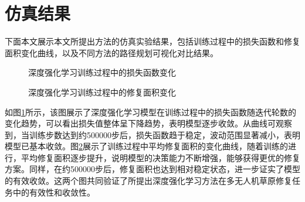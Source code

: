 \documentclass[AutoFakeBold]{LZUThesis}
\begin{document}
\section{仿真结果}


下面本文展示本文所提出方法的仿真实验结果，包括训练过程中的损失函数和修复面积变化曲线，以及不同方法的路径规划可视化对比结果。

\begin{figure}[H]
	\centering
	
	\caption{深度强化学习训练过程中的损失函数变化}
	\label{fig:training_loss_curve}
\end{figure}

\begin{figure}[H]
	\centering
	
	\caption{深度强化学习训练过程中的修复面积变化}
	\label{fig:training_reward_curve}
\end{figure}

如图\ref{fig:training_loss_curve}所示，该图展示了深度强化学习模型在训练过程中的损失函数随迭代轮数的变化趋势，可以看出损失值整体呈下降趋势，表明模型逐步收敛。从曲线可观察到，当训练步数达到约500000步后，损失函数趋于稳定，波动范围显著减小，表明模型已基本收敛。图\ref{fig:training_reward_curve}展示了训练过程中平均修复面积的变化曲线，随着训练的进行，平均修复面积逐步提升，说明模型的决策能力不断增强，能够获得更优的修复方案。同样，在约500000步后，修复面积也达到相对稳定状态，进一步证实了模型的有效收敛。这两个图共同验证了所提出深度强化学习方法在多无人机草原修复任务中的有效性和收敛性。
\end{document}
